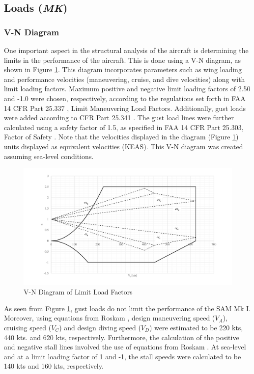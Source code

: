 \subsection{Loads (\textit{MK})}
\subsubsection{V-N Diagram}
\label{subvn}
One important aspect in the structural analysis of the aircraft is determining the limits in the performance of the aircraft. This is done using a V-N diagram, as shown in Figure \ref{figVN}. This diagram incorporates parameters such as wing loading and performance velocities (maneuvering, cruise, and dive velocities) along with limit loading factors. Maximum positive and negative limit loading factors of 2.50 and -1.0 were chosen, respectively, according to the regulations set forth in FAA 14 CFR Part 25.337 \cite{cfr}, Limit Maneuvering Load Factors. Additionally, gust loads were added according to CFR Part 25.341 \cite{cfr}. The gust load lines were further calculated using a safety factor of 1.5, as specified in FAA 14 CFR Part 25.303, Factor of Safety \cite{cfr}. Note that the velocities displayed in the diagram (Figure \ref{figVN}) units displayed as equivalent velocities (KEAS). This V-N diagram was created assuming sea-level conditions. 

\begin{figure}[H]
    \centering
    \includegraphics[width=\linewidth]{Photos/VN_Diagram.pdf}
    \caption{V-N Diagram of Limit Load Factors}
    \label{figVN}
\end{figure}

As seen from Figure \ref{figVN}, gust loads do not limit the performance of the SAM Mk I. Moreover, using equations from Roskam \cite{roskam_5}, design maneuvering speed ($V_{A}$), cruising speed ($V_{C}$) and design diving speed ($V_{D}$) were estimated to be 220 kts, 440 kts. and 620 kts, respectively. Furthermore, the calculation of the positive and negative stall lines involved the use of equations from Roskam \cite{roskam_5}. At sea-level and at a limit loading factor of 1 and -1, the stall speeds were calculated to be 140 kts and 160 kts, respectively.

